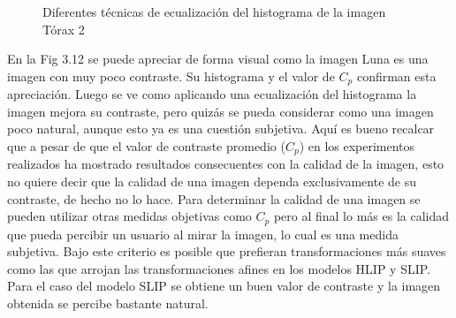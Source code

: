 \begin{figure}
\begin{center}
		\caption{Diferentes t\'ecnicas de ecualizaci\'on del histograma de la imagen T\'orax 2}
	\end{center}
\end{figure}

En la Fig 3.12 se puede apreciar de forma visual como la imagen Luna es una imagen con muy poco contraste. Su histograma y el valor de $C_p$ confirman esta apreciaci\'on. Luego se ve como aplicando una ecualizaci\'on del histograma la imagen mejora su contraste, pero quiz\'as se pueda considerar como una imagen poco natural, aunque esto ya es una cuesti\'on subjetiva. Aqu\'i es bueno recalcar que a pesar de que el valor de contraste promedio ($C_p$) en los experimentos realizados ha mostrado resultados consecuentes con la calidad de la imagen, esto no quiere decir que la calidad de una imagen dependa exclusivamente de su contraste, de hecho no lo hace. Para determinar la calidad de una imagen se pueden utilizar otras medidas objetivas como $C_p$ pero al final lo m\'as es la calidad que pueda percibir un usuario al mirar la imagen, lo cual es una medida subjetiva. Bajo este criterio es posible que prefieran transformaciones m\'as suaves como las que arrojan las transformaciones afines en los modelos HLIP y SLIP. Para el caso del modelo SLIP se obtiene un buen valor de contraste y la imagen obtenida se percibe bastante natural.


